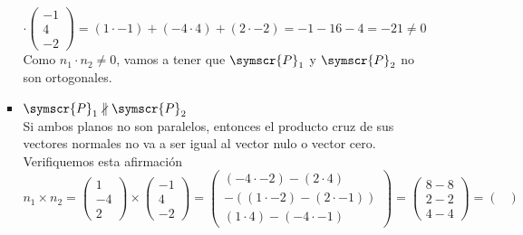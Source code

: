 \documentclass{article}
\def\fancyP{\symscr{P}}
\begin{document}
\begin{enumerate}
\begin{itemize}
\begin{itemize}
\[                        \cdot
                        \begin{pmatrix}
                            -1 \\ 4 \\ -2
                        \end{pmatrix}
                        =
                        (1 \cdot -1) + (-4 \cdot 4) + (2 \cdot -2)
                        =
                        -1 - 16 - 4
                        =
                        -21
                        \neq
                        0
                    \]
                    Como \(n_1 \cdot n_2 \neq 0\), vamos a tener que \(\fancyP_1\) y \(\fancyP_2\) no son ortogonales.
                \item \(\fancyP_1 \nparallel \fancyP_2\) \\
                    Si ambos planos no son paralelos, entonces el producto cruz de sus vectores normales no va a ser igual al vector nulo o vector cero. Verifiquemos esta afirmación
                    \[
                        n_1 \times n_2 
                        =
                        \begin{pmatrix}
                            1 \\ -4 \\ 2
                        \end{pmatrix}
                        \times
                        \begin{pmatrix}
                            -1 \\ 4 \\ -2
                        \end{pmatrix}
                        =
                        \begin{pmatrix}
                            (-4 \cdot -2) - (2 \cdot 4) \\
                            -( (1 \cdot -2) - (2 \cdot -1) ) \\
                            (1 \cdot 4) - (-4 \cdot -1)
                        \end{pmatrix}
                        =
                        \begin{pmatrix}
                            8 - 8 \\
                            2 - 2 \\ 
                            4 - 4
                        \end{pmatrix}
                        =
                        \begin{pmatrix}

\end{pmatrix}\]
\end{itemize}
\end{itemize}
\end{enumerate}
\end{document}
